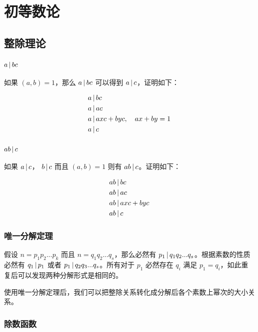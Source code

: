 \chapter{初等数论}

\section{整除理论}

\subsection{ $a \,\vert\, bc $}

如果 $(a,b) = 1$，那么 $a \,\vert\, bc $ 可以得到 $a \,\vert\, c$，证明如下：

\begin{align*}
    & a \,\vert\, bc \\
    & a \,\vert\, ac \\
    & a \,\vert\, axc + byc, \quad ax+by=1  \\
    & a \,\vert\, c
\end{align*}


\subsection{ $ab \,\vert\, c $ }

如果 $a \,\vert\, c$， $b \,\vert\, c$ 而且 $(a,b) = 1$ 则有 $ab \,\vert\, c$。证明如下：

\begin{align*}
    & ab \,\vert\, bc \\
    & ab \,\vert\, ac \\
    & ab \,\vert\, axc + byc \\
    & ab \,\vert\, c
\end{align*}


\subsection{唯一分解定理}

假设 $n = p_1p_2...p_k $ 而且 $n = q_1 q_2...q_s$，那么必然有 $p_1 \,\vert\, q_1q_2...q_s$。根据素数的性质必然有 $q_1 \,\vert\, p_1$ 或者
$p_1 \,\vert\, q_2q_3...q_s$。所有对于 $p_1$ 必然存在 $q_i$ 满足 $p_1 = q_i$，如此重复后可以发现两种分解形式是相同的。

使用唯一分解定理后，我们可以把整除关系转化成分解后各个素数上幂次的大小关系。


\subsection{除数函数}

